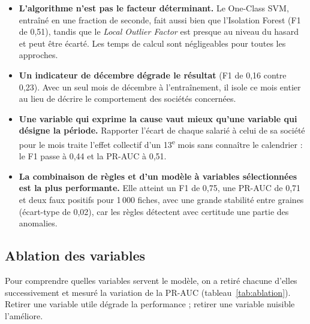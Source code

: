 \begin{itemize}
    \item \textbf{L'algorithme n'est pas le facteur déterminant.} Le One-Class SVM, entraîné en une fraction de seconde, fait aussi bien que l'Isolation Forest (F1 de 0,51), tandis que le \textit{Local Outlier Factor} est presque au niveau du hasard et peut être écarté. Les temps de calcul sont négligeables pour toutes les approches.
    \item \textbf{Un indicateur de décembre dégrade le résultat} (F1 de 0,16 contre 0,23). Avec un seul mois de décembre à l'entraînement, il isole ce mois entier au lieu de décrire le comportement des sociétés concernées.
    \item \textbf{Une variable qui exprime la cause vaut mieux qu'une variable qui désigne la période.} Rapporter l'écart de chaque salarié à celui de sa société pour le mois traite l'effet collectif d'un 13\textsuperscript{e} mois sans connaître le calendrier : le F1 passe à 0,44 et la PR-AUC à 0,51.
    \item \textbf{La combinaison de règles et d'un modèle à variables sélectionnées est la plus performante.} Elle atteint un F1 de 0,75, une PR-AUC de 0,71 et deux faux positifs pour 1\,000 fiches, avec une grande stabilité entre graines (écart-type de 0,02), car les règles détectent avec certitude une partie des anomalies.
\end{itemize}

\subsection{Ablation des variables}

Pour comprendre quelles variables servent le modèle, on a retiré chacune d'elles successivement et mesuré la variation de la PR-AUC (tableau~\ref{tab:ablation}). Retirer une variable utile dégrade la performance ; retirer une variable nuisible l'améliore.

